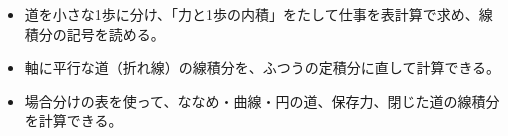 \newcommand\kviiihframe[2][100mm]{\par\addvspace{4pt}{\centering\tikz\node[draw=\bkTT, line width=0.9pt, fill=bkTheme!6, rounded corners=1.5mm, inner xsep=6mm, inner ysep=2.5mm, align=center]{#2};\par}\addvspace{4pt}\noindent\ignorespaces}
\newcommand\kviiiha{\par\vspace{2pt}\noindent\rightskip=0pt plus 8em\relax\hangindent=2.6\zw\hangafter=0\relax}
\newcommand\kviiihb{\par\vspace{2pt}\noindent\rightskip=0pt plus 8em\relax\hangindent=4.3\zw\hangafter=0\relax}
\newcommand\kviiihs{\rightskip=0pt plus 8em\relax}
\makeatother
\makeatletter
\newcommand\kviiihfield[5]{\foreach \kviiihi in {0,0.5,...,#5} {\foreach \kviiihj in {0,0.5,...,#5} {%
  \pgfmathsetmacro\kviiihu{#1}\pgfmathsetmacro\kviiihv{#2}%
  \draw[bkGray!80!black, line width=0.7pt, -{Stealth[length=1.6mm]}] ({\kviiihi*#3},{\kviiihj*#3}) -- ++({\kviiihu*#4},{\kviiihv*#4});}}}
\makeatother


\begin{goal}
\begin{itemize}[label={\color{\bkTT}●}, leftmargin=1.6\zw, itemsep=0pt, topsep=1pt]
\item {}\enspace 道を小さな1歩に分け、「力と1歩の内積」をたして仕事を表計算で求め、線積分の記号を読める。
\item {}\enspace 軸に平行な道（折れ線）の線積分を、ふつうの定積分に直して計算できる。
\item {}\enspace 場合分けの表を使って、ななめ・曲線・円の道、保存力、閉じた道の線積分を計算できる。
\end{itemize}
\end{goal}

